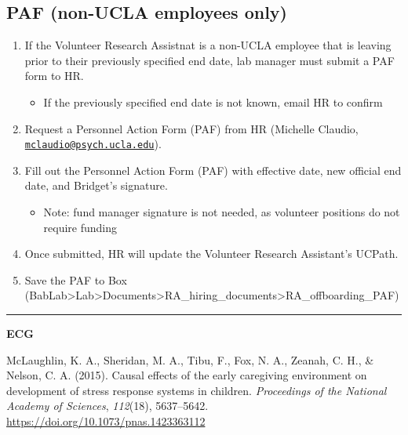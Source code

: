 \documentclass[]{book}
\providecommand{\tightlist}{%
  \setlength{\itemsep}{0pt}\setlength{\parskip}{0pt}}
\begin{document}
\hypertarget{paf-non-ucla-employees-only}{%
\subsection{PAF (non-UCLA employees only)}\label{paf-non-ucla-employees-only}}

\begin{enumerate}
\def\labelenumi{\arabic{enumi}.}
\tightlist
\item
  If the Volunteer Research Assistnat is a non-UCLA employee that is leaving prior to their previously specified end date, lab manager must submit a PAF form to HR.

  \begin{itemize}
  \tightlist
  \item
    If the previously specified end date is not known, email HR to confirm
  \end{itemize}
\item
  Request a Personnel Action Form (PAF) from HR (Michelle Claudio, \href{mailto:mclaudio@psych.ucla.edu}{\nolinkurl{mclaudio@psych.ucla.edu}}).
\item
  Fill out the Personnel Action Form (PAF) with effective date, new official end date, and Bridget's signature.

  \begin{itemize}
  \tightlist
  \item
    Note: fund manager signature is not needed, as volunteer positions do not require funding
  \end{itemize}
\item
  Once submitted, HR will update the Volunteer Research Assistant's UCPath.
\item
  Save the PAF to Box (BabLab\textgreater{}Lab\textgreater{}Documents\textgreater{}RA\_hiring\_documents\textgreater{}RA\_offboarding\_PAF)
\end{enumerate}

\begin{center}\rule{0.5\linewidth}{0.5pt}\end{center}

\textbf{ECG}

McLaughlin, K. A., Sheridan, M. A., Tibu, F., Fox, N. A., Zeanah, C. H., \& Nelson, C. A. (2015). Causal effects of the early caregiving environment on development of stress response systems in children. \emph{Proceedings of the National Academy of Sciences}, \emph{112}(18), 5637--5642.\\
\url{https://doi.org/10.1073/pnas.1423363112}
\end{document}

